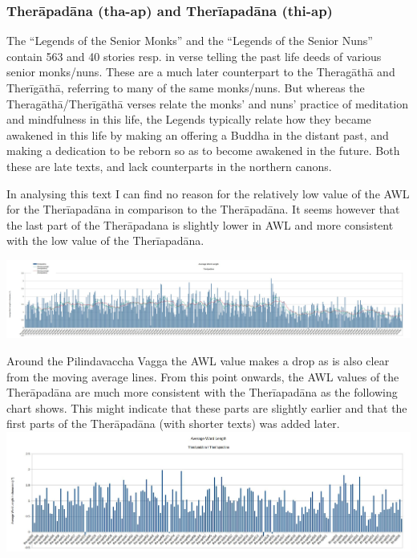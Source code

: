\subsubsection{Therāpadāna (tha-ap) and Therīapadāna (thi-ap)}
The “Legends of the Senior Monks” and the “Legends of the Senior Nuns” contain 563 and 40 stories resp. in verse telling the past life deeds of various senior monks/nuns. These are a much later counterpart to the Theragāthā and Therīgāthā, referring to many of the same monks/nuns. But whereas the Theragāthā/Therīgāthā verses relate the monks’ and nuns’ practice of meditation and mindfulness in this life, the Legends typically relate how they became awakened in this life by making an offering a Buddha in the distant past, and making a dedication to be reborn so as to become awakened in the future. Both these are late texts, and lack counterparts in the northern canons.

In analysing this text I can find no reason for the relatively low value of the AWL for the Therīapadāna in comparison to the Therāpadāna. It seems however that the last part of the Therāpadana is slightly lower in AWL and more consistent with the low value of the Therīapadāna.

\includegraphics[width=\linewidth]{thaap.jpg}
\label{thaap}

\medskip
Around the Pilindavaccha Vagga the AWL value makes a drop as is also clear from the moving average lines. From this point onwards, the AWL values of the Therāpadāna are much more consistent with the Therīapadāna as the following chart shows. This might indicate that these parts are slightly earlier and that the first parts of the Therāpadāna (with shorter texts) was added later.\\

\includegraphics[width=\linewidth]{thaiap.jpg}
\label{thaiap}

